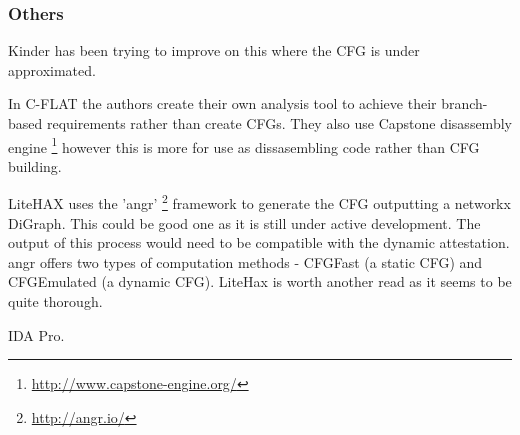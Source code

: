 \subsubsection{Others}

Kinder \cite{Kinder2012} has been trying to improve on this where the CFG is under approximated.

In C-FLAT \cite{Abera2016} the authors create their own analysis tool to achieve their branch-based requirements rather than create CFGs. They also use Capstone disassembly engine \footnote{\url{http://www.capstone-engine.org/}} however this is more for use as dissasembling code rather than CFG building.

LiteHAX \cite{Dessouky2018} uses the 'angr' \footnote{\url{http://angr.io/}} \cite{Shoshitaishvili2016} framework to generate the CFG outputting a networkx DiGraph. This could be good one as it is still under active development. The output of this process would need to be compatible with the dynamic attestation. angr offers two types of computation methods - CFGFast (a static CFG) and CFGEmulated (a dynamic CFG). LiteHax is worth another read as it seems to be quite thorough.

IDA Pro. 